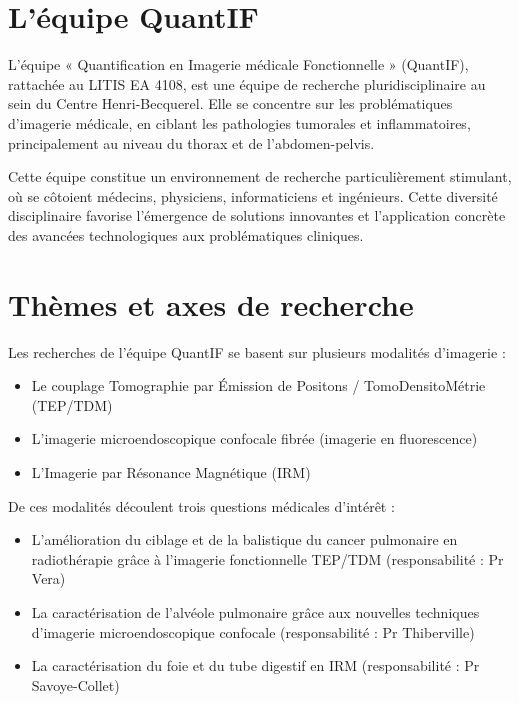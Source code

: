 \documentclass[12pt,a4paper]{report}
\begin{document}
\section{L'équipe QuantIF}

L'équipe « Quantification en Imagerie médicale Fonctionnelle » (QuantIF), rattachée au LITIS EA 4108, est une équipe de recherche pluridisciplinaire au sein du Centre Henri-Becquerel. Elle se concentre sur les problématiques d'imagerie médicale, en ciblant les pathologies tumorales et inflammatoires, principalement au niveau du thorax et de l'abdomen-pelvis.

Cette équipe constitue un environnement de recherche particulièrement stimulant, où se côtoient médecins, physiciens, informaticiens et ingénieurs. Cette diversité disciplinaire favorise l'émergence de solutions innovantes et l'application concrète des avancées technologiques aux problématiques cliniques.

\section{Thèmes et axes de recherche}

Les recherches de l'équipe QuantIF se basent sur plusieurs modalités d'imagerie :

\begin{itemize}
\item Le couplage Tomographie par Émission de Positons / TomoDensitoMétrie (TEP/TDM)
\item L'imagerie microendoscopique confocale fibrée (imagerie en fluorescence)
\item L'Imagerie par Résonance Magnétique (IRM)
\end{itemize}

De ces modalités découlent trois questions médicales d'intérêt :

\begin{itemize}
\item L'amélioration du ciblage et de la balistique du cancer pulmonaire en radiothérapie grâce à l'imagerie fonctionnelle TEP/TDM (responsabilité : Pr Vera)
\item La caractérisation de l'alvéole pulmonaire grâce aux nouvelles techniques d'imagerie microendoscopique confocale (responsabilité : Pr Thiberville)
\item La caractérisation du foie et du tube digestif en IRM (responsabilité : Pr Savoye-Collet)
\end{itemize}
\end{document}
